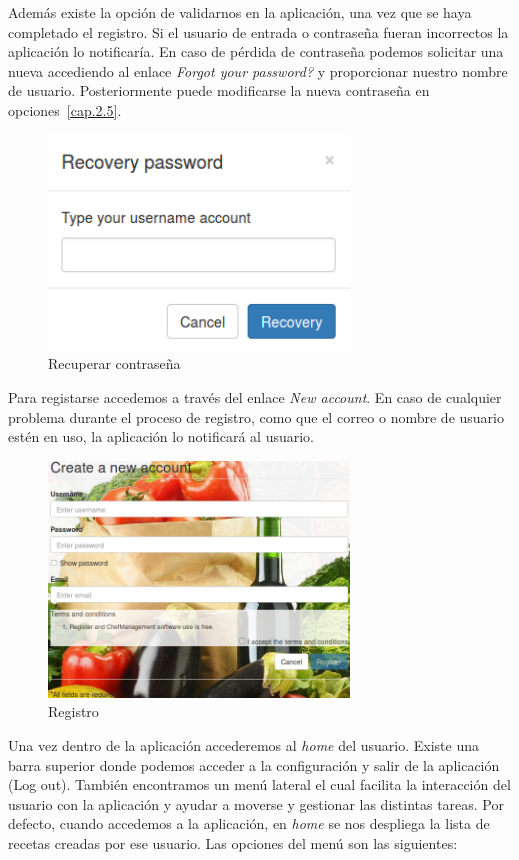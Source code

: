 Además existe la opción de validarnos en la aplicación, una vez que se haya completado el registro. Si el usuario de entrada o contraseña fueran incorrectos la aplicación lo notificaría. En caso de pérdida de contraseña podemos solicitar una nueva accediendo al enlace \emph{Forgot your password?} y proporcionar nuestro nombre de usuario. Posteriormente puede modificarse la nueva contraseña en opciones~\ref{cap.2.5}.

\begin{figure}[H]
	\centering
	\includegraphics[width=8cm]{./images/chefmanagement-recovery.png}
	\caption{Recuperar contraseña} \label{fig:chefmanagement-recovery}
\end{figure}

Para registarse accedemos a través del enlace \emph{New account}. En caso de cualquier problema durante el proceso de registro, como que el correo o nombre de usuario estén en uso, la aplicación lo notificará al usuario.

\begin{figure}[H]
	\centering
	\includegraphics[width=8cm]{./images/chefmanagement-register.png}
	\caption{Registro} \label{fig:chefmanagement-register}
\end{figure}

Una vez dentro de la aplicación accederemos al \emph{home} del usuario. Existe una barra superior donde podemos acceder a la configuración y salir de la aplicación (Log out). También encontramos un menú lateral el cual facilita la interacción del usuario con la aplicación y ayudar a moverse y gestionar las distintas tareas. Por defecto, cuando accedemos a la aplicación, en \emph{home} se nos despliega la lista de recetas creadas por ese usuario. Las opciones del menú son las siguientes:

